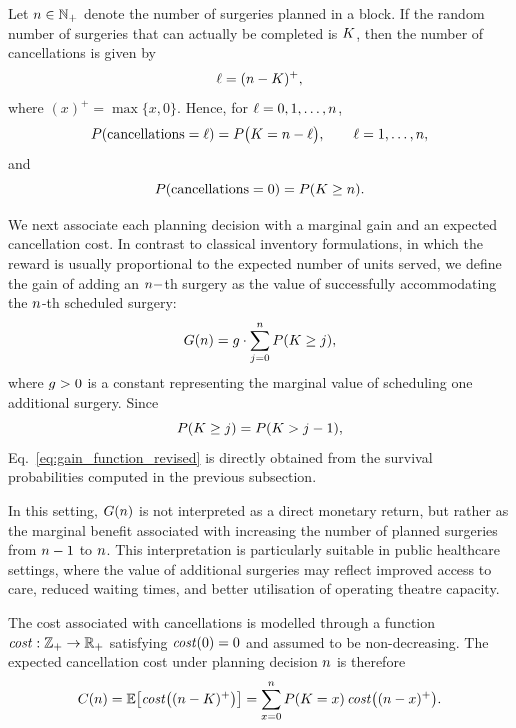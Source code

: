 Let $n \in \mathbb{N}_{+}$ denote the number of surgeries planned in a block. 
If the random number of surgeries that can actually be completed is $K$, then the number of cancellations is given by
\[
\ell = (n-K)^{+},
\]
where $(x)^{+}=\max\{x,0\}$. 
Hence, for $\ell = 0,1,\dots,n$,
\begin{equation}\label{eq:cancellation_prob}
P(\text{cancellations}=\ell)
=
P\bigl(K = n-\ell\bigr),
\qquad \ell = 1,\dots,n,
\end{equation}
and
\[
P(\text{cancellations}=0)=P(K \geq n).
\]

We next associate each planning decision with a marginal gain and an expected cancellation cost. 
In contrast to classical inventory formulations, in which the reward is usually proportional to the expected number of units served, we define the gain of adding an $n-$th surgery as the value of successfully accommodating the $n$-th scheduled surgery:
\begin{equation}\label{eq:gain_function_revised}
    G(n) = g \cdot \sum_{j=0}^n P(K \geq j),
\end{equation}
where $g>0$ is a constant representing the marginal value of scheduling one additional surgery. Since
\[
P(K \geq j)=P(K > j-1),
\]
Eq.~\eqref{eq:gain_function_revised} is directly obtained from the survival probabilities computed in the previous subsection.

In this setting, $G(n)$ is not interpreted as a direct monetary return, but rather as the marginal benefit associated with increasing the number of planned surgeries from $n-1$ to $n$. 
This interpretation is particularly suitable in public healthcare settings, where the value of additional surgeries may reflect improved access to care, reduced waiting times, and better utilisation of operating theatre capacity.

The cost associated with cancellations is modelled through a function $\mathit{cost}:\mathbb{Z}_{+} \rightarrow\mathbb{R}_{+}$ satisfying $\mathit{cost}(0)=0$ and assumed to be non-decreasing. 
The expected cancellation cost under planning decision $n$ is therefore
\begin{equation}\label{eq:cost_function_revised}
    C(n)
    =
    \mathbb{E}\bigl[\mathit{cost}\bigl((n-K)^{+}\bigr)\bigr]
    =
    \sum_{x=0}^{n} P(K=x)\,
    \mathit{cost}\bigl((n-x)^{+}\bigr).
\end{equation}

